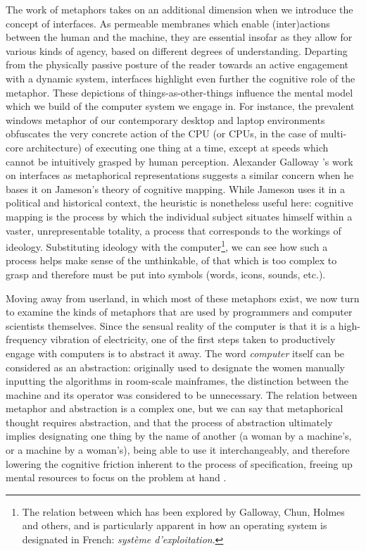 The work of metaphors takes on an additional dimension when we introduce the concept of interfaces. As permeable membranes which enable (inter)actions between the human and the machine, they are essential insofar as they allow for various kinds of agency, based on different degrees of understanding. Departing from the physically passive posture of the reader towards an active engagement with a dynamic system, interfaces highlight even further the cognitive role of the metaphor. These depictions of things-as-other-things influence the mental model which we build of the computer system we engage in. For instance, the prevalent windows metaphor of our contemporary desktop and laptop environments obfuscates the very concrete action of the CPU (or CPUs, in the case of multi-core architecture) of executing one thing at a time, except at speeds which cannot be intuitively grasped by human perception. Alexander Galloway 's work on interfaces as metaphorical representations suggests a similar concern when he bases it on Jameson's theory of cognitive mapping. While Jameson uses it in a political and historical context, the heuristic is nonetheless useful here: cognitive mapping is the process by which the individual subject situates himself within a vaster, unrepresentable totality, a process that corresponds to the workings of ideology. Substituting ideology with the computer\footnote{The relation between which has been explored by Galloway, Chun, Holmes and others, and is particularly apparent in how an operating system is designated in French: \emph{système d'exploitation}.}, we can see how such a process helps make sense of the unthinkable, of that which is too complex to grasp and therefore must be put into symbols (words, icons, sounds, etc.).


Moving away from userland, in which most of these metaphors exist, we now turn to examine the kinds of metaphors that are used by programmers and computer scientists themselves. Since the sensual reality of the computer is that it is a high-frequency vibration of electricity, one of the first steps taken to productively engage with computers is to abstract it away. The word \emph{computer} itself can be considered as an abstraction: originally used to designate the women manually inputting the algorithms in room-scale mainframes, the distinction between the machine and its operator was considered to be unnecessary. The relation between metaphor and abstraction is a complex one, but we can say that metaphorical thought requires abstraction, and that the process of abstraction ultimately implies designating one thing by the name of another (a woman by a machine's, or a machine by a woman's), being able to use it interchangeably, and therefore lowering the cognitive friction inherent to the process of specification, freeing up mental resources to focus on the problem at hand \citep{chun_software_2005}.

